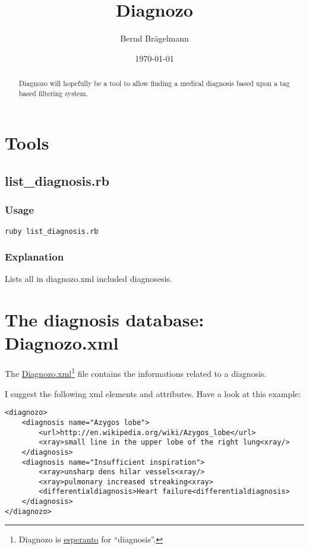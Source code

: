 \documentclass{article}
\title{Diagnozo}
\author{Bernd Brägelmann}
\date{\today}
\begin{document}
\maketitle
\tableofcontents

\begin{abstract}
Diagnozo will hopefully be a tool to allow finding a medical diagnosis based upon a tag based filtering system.
\end{abstract}

\section{Tools}

\subsection{list\_diagnosis.rb}
\subsubsection{Usage}
\begin{verbatim}
ruby list_diagnosis.rb
\end{verbatim}

\subsubsection{Explanation}
Lists all in diagnozo.xml included diagnosesis.


\section{The diagnosis database: Diagnozo.xml}

The \href{https://github.com/braegel/Diagnozo/blob/master/data/diagnozo.xml}{Diagnozo.xml}\footnote{Diagnozo is \href{http://en.wikipedia.org/wiki/Esperanto}{esperanto} for ``diagnosis''.} file contains the informations related to a diagnosis.

I suggest the following xml elements and attributes. Have a look at this example:

\lstset{language=xml}
\begin{lstlisting}[caption="First version of Diagnozo.xml",label="firstversionofdiagnozoxml",breaklines=true,frame=tlRB]
<diagnozo>
	<diagnosis name="Azygos lobe">
		<url>http://en.wikipedia.org/wiki/Azygos_lobe</url>
		<xray>small line in the upper lobe of the right lung<xray/>
	</diagnosis>
	<diagnosis name="Insufficient inspiration">
		<xray>unsharp dens hilar vessels<xray/>
		<xray>pulmonary increased streaking<xray>
		<differentialdiagnosis>Heart failure<differentialdiagnosis>
	</diagnosis>
</diagnozo>
\end{lstlisting}
\end{document}
